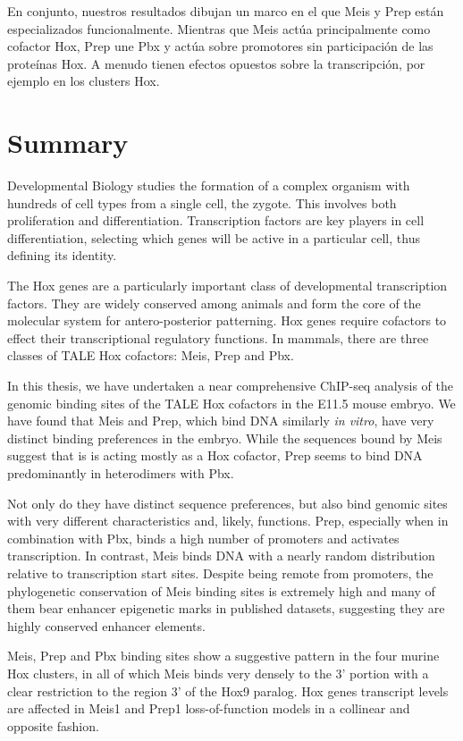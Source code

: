 En conjunto, nuestros resultados dibujan un marco en el que Meis y Prep están especializados funcionalmente. Mientras que Meis actúa principalmente como cofactor Hox, Prep une Pbx y actúa sobre promotores sin participación de las proteínas Hox. A menudo tienen efectos opuestos sobre la transcripción, por ejemplo en los clusters Hox.






\chapter{Summary}

Developmental Biology studies the formation of a complex organism with hundreds of cell types from a single cell, the zygote. This involves both proliferation and differentiation. Transcription factors are key players in cell differentiation, selecting which genes will be active in a particular cell, thus defining its identity. 

The Hox genes are a particularly important class of developmental transcription factors. They are widely conserved among animals and form the core of the molecular system for antero-posterior patterning. Hox genes require cofactors to effect their transcriptional regulatory functions. In mammals, there are three classes of TALE Hox cofactors: Meis, Prep and Pbx. 

In this thesis, we have undertaken a near comprehensive ChIP-seq analysis of the genomic binding sites of the TALE Hox cofactors in the E11.5 mouse embryo. We have found that Meis and Prep, which bind DNA similarly \textit{in vitro}, have very distinct binding preferences in the embryo. While the sequences bound by Meis suggest that is is acting mostly as a Hox cofactor, Prep seems to bind DNA predominantly in heterodimers with Pbx. 

Not only do they have distinct sequence preferences, but also bind genomic sites with very different characteristics and, likely, functions. Prep, especially when in combination with Pbx, binds a high number of promoters and activates transcription. In contrast, Meis binds DNA with a nearly random distribution relative to transcription start sites. Despite being remote from promoters, the phylogenetic conservation of Meis binding sites is extremely high and many of them bear enhancer epigenetic marks in published datasets, suggesting they are highly conserved enhancer elements. 

Meis, Prep and Pbx binding sites show a suggestive pattern in the four murine Hox clusters, in all of which Meis binds very densely to the 3' portion with a clear restriction to the region 3' of the Hox9 paralog. Hox genes transcript levels are affected in Meis1 and Prep1 loss-of-function models in a collinear and opposite fashion. 

